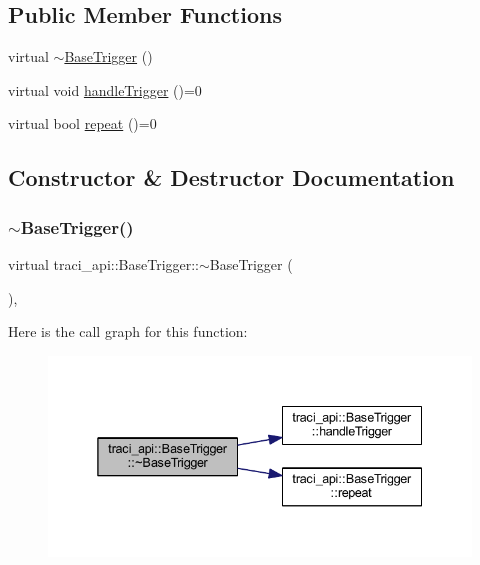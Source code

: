\subsection*{Public Member Functions}
\begin{DoxyCompactItemize}
\item 
virtual \hyperlink{classtraci__api_1_1_base_trigger_ae1e572064f6b16fa1de9e5416b6c1a9c}{$\sim$\+Base\+Trigger} ()
\item 
virtual void \hyperlink{classtraci__api_1_1_base_trigger_a2de2824fb1d228d4c04aa15c272017a5}{handle\+Trigger} ()=0
\item 
virtual bool \hyperlink{classtraci__api_1_1_base_trigger_a7d2b1ac3f54e42e71eae69f1c7f33943}{repeat} ()=0
\end{DoxyCompactItemize}


\subsection{Constructor \& Destructor Documentation}
\mbox{\label{classtraci__api_1_1_base_trigger_ae1e572064f6b16fa1de9e5416b6c1a9c}} 
\subsubsection{\texorpdfstring{$\sim$\+Base\+Trigger()}{~BaseTrigger()}}
{\footnotesize\ttfamily virtual traci\+\_\+api\+::\+Base\+Trigger\+::$\sim$\+Base\+Trigger (\begin{DoxyParamCaption}{ }\end{DoxyParamCaption})\hspace{0.3cm}{\ttfamily [inline]}, {\ttfamily [virtual]}}

Here is the call graph for this function\+:
\nopagebreak
\begin{figure}[H]
\begin{center}
\leavevmode
\includegraphics[width=338pt]{classtraci__api_1_1_base_trigger_ae1e572064f6b16fa1de9e5416b6c1a9c_cgraph}
\end{center}
\end{figure}


